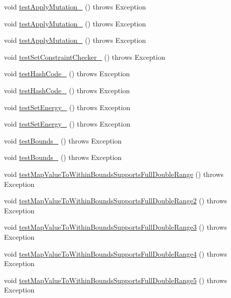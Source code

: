 \begin{DoxyCompactItemize}
\item 
void \hyperlink{classorg_1_1jgap_1_1impl_1_1_double_gene_test_adda8bc3c6f8a846d9c3f72b0ecae2687}{test\-Apply\-Mutation\-\_} ()  throws Exception 
\item 
void \hyperlink{classorg_1_1jgap_1_1impl_1_1_double_gene_test_afb8af34f87912cda2dc1786bf0370443}{test\-Apply\-Mutation\-\_} ()  throws Exception 
\item 
void \hyperlink{classorg_1_1jgap_1_1impl_1_1_double_gene_test_a3d78e0f2ed639bb1beb325bb62c49877}{test\-Apply\-Mutation\-\_} ()  throws Exception 
\item 
void \hyperlink{classorg_1_1jgap_1_1impl_1_1_double_gene_test_aab5661f006960b5b617a9a35d3f6638a}{test\-Set\-Constraint\-Checker\-\_} ()  throws Exception 
\item 
void \hyperlink{classorg_1_1jgap_1_1impl_1_1_double_gene_test_a2832659fb3d8a1adec0c88443be3619c}{test\-Hash\-Code\-\_} ()  throws Exception 
\item 
void \hyperlink{classorg_1_1jgap_1_1impl_1_1_double_gene_test_a2213279d3483e26ce78597f3e00ea859}{test\-Hash\-Code\-\_} ()  throws Exception 
\item 
void \hyperlink{classorg_1_1jgap_1_1impl_1_1_double_gene_test_aa3bfbe1da45e50076461af450213a18d}{test\-Set\-Energy\-\_} ()  throws Exception 
\item 
void \hyperlink{classorg_1_1jgap_1_1impl_1_1_double_gene_test_a283385f9c99041206f7996a76a9fc5da}{test\-Set\-Energy\-\_} ()  throws Exception 
\item 
void \hyperlink{classorg_1_1jgap_1_1impl_1_1_double_gene_test_a18fa1aa01c4a566a565aee2c6614b18a}{test\-Bounds\-\_} ()  throws Exception 
\item 
void \hyperlink{classorg_1_1jgap_1_1impl_1_1_double_gene_test_adfd7251ebe9018d0e5c914aa096153dc}{test\-Bounds\-\_} ()  throws Exception 
\item 
void \hyperlink{classorg_1_1jgap_1_1impl_1_1_double_gene_test_a5add564c0cfdabdb6653ce37733aec81}{test\-Map\-Value\-To\-Within\-Bounds\-Supports\-Full\-Double\-Range} ()  throws Exception 
\item 
void \hyperlink{classorg_1_1jgap_1_1impl_1_1_double_gene_test_a7325ad49582d7aa552cb5fe916b07bf4}{test\-Map\-Value\-To\-Within\-Bounds\-Supports\-Full\-Double\-Range2} ()  throws Exception 
\item 
void \hyperlink{classorg_1_1jgap_1_1impl_1_1_double_gene_test_a9160143307a32535102f3e8cd584807e}{test\-Map\-Value\-To\-Within\-Bounds\-Supports\-Full\-Double\-Range3} ()  throws Exception 
\item 
void \hyperlink{classorg_1_1jgap_1_1impl_1_1_double_gene_test_a8b63897ed935aad5f540677592f3fccb}{test\-Map\-Value\-To\-Within\-Bounds\-Supports\-Full\-Double\-Range4} ()  throws Exception 
\item 
void \hyperlink{classorg_1_1jgap_1_1impl_1_1_double_gene_test_a13b425255966c43d85780abc24e13a41}{test\-Map\-Value\-To\-Within\-Bounds\-Supports\-Full\-Double\-Range5} ()  throws Exception 
\end{DoxyCompactItemize}
